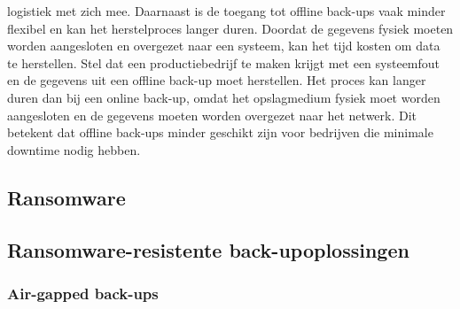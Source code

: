 logistiek met zich mee. Daarnaast is de toegang tot offline back-ups vaak minder flexibel en kan het herstelproces langer duren. Doordat de gegevens fysiek moeten worden aangesloten en overgezet naar een systeem, kan het tijd kosten om data te herstellen. Stel dat een productiebedrijf te maken krijgt met een systeemfout en de gegevens uit een offline back-up moet herstellen. Het proces kan langer duren dan bij een online back-up, omdat het opslagmedium fysiek moet worden aangesloten en de gegevens moeten worden overgezet naar het netwerk. Dit betekent dat offline back-ups minder geschikt zijn voor bedrijven die minimale downtime nodig hebben.

\subsection{Ransomware}
\subsection{Ransomware-resistente back-upoplossingen}
\subsubsection{Air-gapped back-ups}
